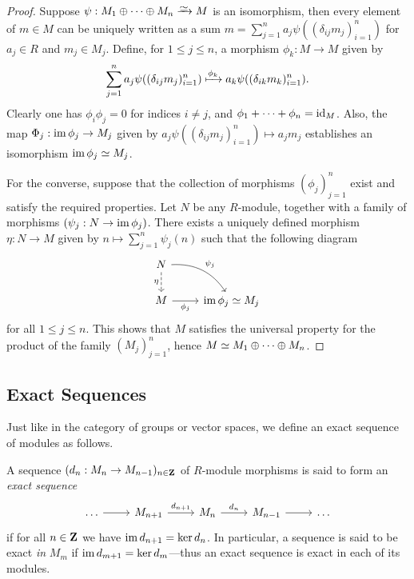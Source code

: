 \begin{proof}
Suppose \(\psi: M_1 \oplus \dots \oplus M_n \isoto M\) is an isomorphism, then
every element of \(m \in M\) can be uniquely written as a sum
\(m = \sum_{j=1}^n a_j \psi((\delta_{ij} m_j)_{i=1}^n)\) for \(a_j \in R\) and
\(m_j \in M_j\). Define, for \(1 \leq j \leq n\), a morphism \(\phi_k: M \to M\)
given by
\[
\sum_{j=1}^n a_j \psi((\delta_{ij} m_j)_{i=1}^n)
\xmapsto{\phi_k} a_k \psi((\delta_{i k} m_k)_{i=1}^n).
\]
Clearly one has \(\phi_i \phi_j = 0\) for indices \(i \neq j\), and
\(\phi_1 + \dots + \phi_n = \operatorname{id}_M\). Also, the map
\(\Phi_j: \operatorname{im} \phi_j \to M_j\) given by
\(a_j \psi((\delta_{i j} m_j)_{i=1}^n) \mapsto a_j m_j\) establishes an
isomorphism \(\operatorname{im} \phi_j \simeq M_j\).

For the converse, suppose that the collection of morphisms \((\phi_j)_{j=1}^n\)
exist and satisfy the required properties. Let \(N\) be any \(R\)-module,
together with a family of morphisms \((\psi_j: N \to \operatorname{im} \phi_j)\). There
exists a uniquely defined morphism \(\eta: N \to M\) given by
\(n \mapsto \sum_{j=1}^n \psi_j(n)\) such that the following diagram
\[
\begin{tikzcd}
N \ar[d, "\eta"', dashed] \ar[rd, bend left, "\psi_j"] &\\
M \ar[r, "\phi_j"'] &\im \phi_j \iso M_j
\end{tikzcd}
\]
for all \(1 \leq j \leq n\). This shows that \(M\) satisfies the universal
property for the product of the family \((M_j)_{j=1}^n\), hence
\(M \simeq M_1 \oplus \dots \oplus M_n\).
\end{proof}

\subsection{Exact Sequences}

Just like in the category of groups or vector spaces, we define an exact
sequence of modules as follows.

\begin{definition}
\label{def:exact-sequence-modules}
A sequence \((d_n: M_n \to M_{n-1})_{n \in \mathbf{Z}}\) of \(R\)-module morphisms is
said to form an \emph{exact sequence}
\[
\begin{tikzcd}
\dots \ar[r] &M_{n+1} \ar[r, "d_{n+1}"]
&M_n \ar[r, "d_n"] &M_{n-1} \ar[r] &\dots
\end{tikzcd}
\]
if for all \(n \in \mathbf{Z}\) we have \(\operatorname{im} d_{n+1} = \ker d_n\). In particular, a
sequence is said to be exact \emph{in} \(M_m\) if
\(\operatorname{im} d_{m + 1} = \ker d_m\)---thus an exact sequence is exact in each of its
modules.
\end{definition}

